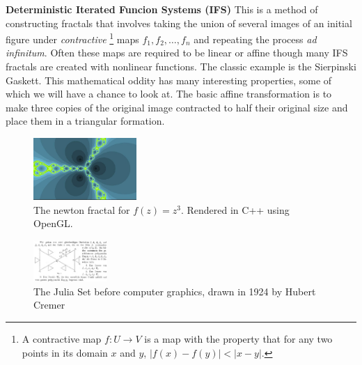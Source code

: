 \documentclass[11pt,oneside,final]{article}
\begin{document}
\noindent\textbf{Deterministic Iterated Funcion Systems (IFS)} This is a method
of constructing fractals that involves taking the union of several images of an
initial figure under \emph{contractive} \footnote{A contractive map \(f: U
\rightarrow V\) is a map with the property that for any two points in its
domain \(x\) and \(y\), \(|f(x) - f(y)| < |x-y|\).} maps \(f_1, f_2,
\ldots, f_n\) and repeating the process \emph{ad infinitum}.  Often these
maps are required to be linear or affine though many IFS fractals are
created with nonlinear functions. The classic example is the Sierpinski
Gaskett.  This mathematical oddity has many interesting properties, some of
which we will have a chance to look at. The basic affine transformation is
to make three copies of the original image contracted to half their
original size and place them in a triangular formation. \\

\begin{figure}
	\includegraphics[width=0.35\textwidth]{newton_z3-1}
	\caption{The newton fractal for \(f(z) = z^3\). Rendered in C++ using OpenGL.}
\end{figure}

\begin{figure}
	\includegraphics[width=0.25\textwidth]{julia_triangles_cropped}
	\caption{The Julia Set before computer graphics, drawn in 1924 by Hubert
	Cremer \cite{wahl}}
\end{figure}
\end{document}
